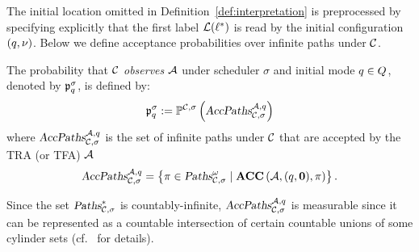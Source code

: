 The initial location omitted in Definition~\ref{def:interpretation} is preprocessed by specifying explicitly that the first label $\mathcal{L}(\ell^*)$ is read by the initial configuration $(q,\nu)$.
Below we define acceptance probabilities over infinite paths under $\mathcal{C}$.
\begin{definition}
The probability that $\mathcal{C}$ \emph{observes} $\mathcal{A}$ under scheduler $\sigma$ and initial mode $q\in Q$, denoted by $\mathfrak{p}_{q}^{\sigma}$, is defined by:
\[
    \mathfrak{p}_{q}^{\sigma}
        :=
            \mathbb{P}^{\mathcal{C},\sigma}\left(
                \mbox{\sl AccPaths} _{\mathcal{C},\sigma} ^{\mathcal{A},q}
            \right)
\]
where $\mbox{\sl AccPaths} _{\mathcal{C},\sigma} ^{\mathcal{A},q}$ is the set of infinite paths under $\mathcal{C}$ that are accepted by the TRA (or TFA) $\mathcal{A}$
$$
    \mbox{\sl AccPaths} _{\mathcal{C},\sigma} ^{\mathcal{A},q} = \left \{
        \pi \in \mbox{\sl Paths}^\omega_{\mathcal{C},\sigma} \mid
        \mbox{\bf ACC} \left( {\mathcal{A}}, {(q,\mathbf{0})}, {\pi} \right)
    \right\}.
$$
\end{definition}
Since the set $\mbox{\sl Paths}^*_{\mathcal{C},\sigma}$ is countably-infinite,
$\mbox{\sl AccPaths} _{\mathcal{C},\sigma} ^{\mathcal{A},q}$ is measurable since it can be represented as a countable intersection of certain countable unions of some cylinder sets (cf.~\cite[Chap. ?]{DBLP:books/daglib/0020348} for details).
